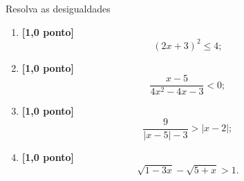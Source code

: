 Resolva as desigualdades
\begin{enumerate}
	\item{\bf [1,0 ponto]}
	\[
		(2x+3)^2\leq 4;
	\]
	\item{\bf [1,0 ponto]}
	\[
		\frac{x-5}{4x^2-4x-3}<0;
	\]
	\item{\bf [1,0 ponto]}
	\[
		\frac{9}{|x-5|-3}>|x-2|;
	\]
	\item{\bf [1,0 ponto]}
	\[
		\sqrt{1-3x}-\sqrt{5+x}>1.
	\]
\end{enumerate}
